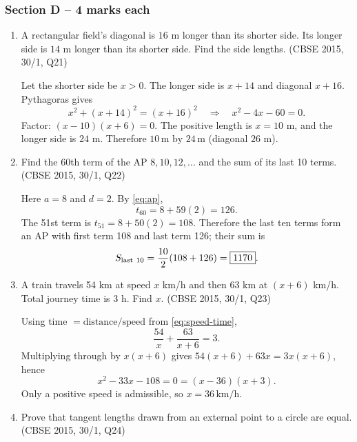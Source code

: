 \subsubsection{Section D -- 4 marks each}
\begin{enumerate}[label=\textbf{Q\arabic*.},ref=\arabic*,start=21]

\item A rectangular field's diagonal is $16$ m longer than its shorter side. Its longer side is $14$ m longer than its shorter side. Find the side lengths. \hfill (CBSE 2015, 30/1, Q21)

\solution Let the shorter side be $x>0$. The longer side is $x+14$ and diagonal $x+16$. Pythagoras gives
\[
x^2+(x+14)^2=(x+16)^2\quad\Longrightarrow\quad x^2-4x-60=0.
\]
Factor: $(x-10)(x+6)=0$. The positive length is $x=10$ m, and the longer side is $24$ m. Therefore $\boxed{10\,\mathrm m\text{ by }24\,\mathrm m}$ (diagonal $26$ m).

\item Find the 60th term of the AP $8,10,12,\ldots$ and the sum of its last 10 terms. \hfill (CBSE 2015, 30/1, Q22)

\solution Here $a=8$ and $d=2$. By \eqref{eq:ap},
\[
t_{60}=8+59(2)=\boxed{126}.
\]
The 51st term is $t_{51}=8+50(2)=108$. Therefore the last ten terms form an AP with first term 108 and last term 126; their sum is
\[
S_{\rm last\ 10}=\frac{10}{2}(108+126)=\boxed{1170}.
\]

\item A train travels 54 km at speed $x$ km/h and then 63 km at $(x+6)$ km/h. Total journey time is 3 h. Find $x$. \hfill (CBSE 2015, 30/1, Q23)

\solution Using time $=\text{distance}/\text{speed}$ from \eqref{eq:speed-time},
\[
\frac{54}{x}+\frac{63}{x+6}=3.
\]
Multiplying through by $x(x+6)$ gives $54(x+6)+63x=3x(x+6)$, hence
\[
x^2-33x-108=0=(x-36)(x+3).
\]
Only a positive speed is admissible, so $\boxed{x=36\,\mathrm{km/h}}$.

\item Prove that tangent lengths drawn from an external point to a circle are equal. \hfill (CBSE 2015, 30/1, Q24)


\end{enumerate}
